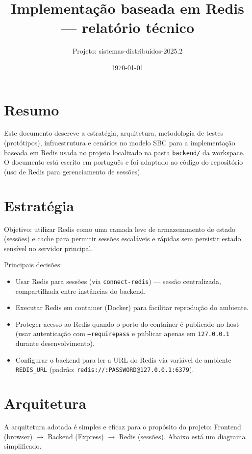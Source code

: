 \documentclass[a4paper,11pt]{article}
\title{Implementação baseada em Redis — relatório técnico}
\author{Projeto: sistemas-distribuidos-2025.2}
\date{\today}
\begin{document}
\maketitle

\section*{Resumo}
Este documento descreve a estratégia, arquitetura, metodologia de testes (protótipos), infraestrutura e cenários no modelo SBC para a implementação baseada em Redis usada no projeto localizado na pasta \texttt{backend/} da workspace. O documento está escrito em português e foi adaptado ao código do repositório (uso de Redis para gerenciamento de sessões).

\section{Estratégia}
Objetivo: utilizar Redis como uma camada leve de armazenamento de estado (sessões) e cache para permitir sessões escaláveis e rápidas sem persistir estado sensível no servidor principal.

Principais decisões:
\begin{itemize}
  \item Usar Redis para sessões (via \texttt{connect-redis}) — sessão centralizada, compartilhada entre instâncias do backend.
  \item Executar Redis em container (Docker) para facilitar reprodução do ambiente.
  \item Proteger acesso ao Redis quando o porto do container é publicado no host (usar autenticação com \texttt{--requirepass} e publicar apenas em \texttt{127.0.0.1} durante desenvolvimento).
  \item Configurar o backend para ler a URL do Redis via variável de ambiente \texttt{REDIS_URL} (padrão: \texttt{redis://:PASSWORD@127.0.0.1:6379}).
\end{itemize}

\section{Arquitetura}
A arquitetura adotada é simples e eficaz para o propósito do projeto: Frontend (browser) \(\to\) Backend (Express) \(\to\) Redis (sessões). Abaixo está um diagrama simplificado.
\end{document}
